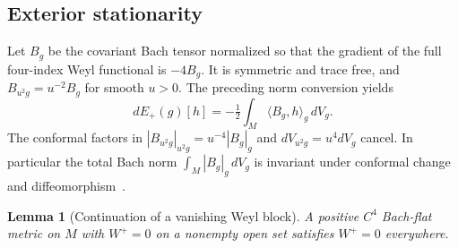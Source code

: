 \documentclass[11pt]{article}
\numberwithin{equation}{section}
\newtheorem{lemma}[theorem]{Lemma}
\theoremstyle{definition}
\theoremstyle{remark}
\begin{document}
\subsection{Exterior stationarity}

Let \(B_g\) be the covariant Bach tensor normalized so that the
gradient of the full four-index Weyl functional is \(-4B_g\).
It is symmetric and trace free, and
\(B_{u^2g}=u^{-2}B_g\) for smooth \(u>0\). The preceding norm
conversion yields
\begin{equation}\label{var:bach}
 dE_+(g)[h]=-\tfrac12\int_M\langle B_g,h\rangle_g\,dV_g .
\end{equation}
The conformal factors in \(|B_{u^2g}|_{u^2g}=u^{-4}|B_g|_g\)
and \(dV_{u^2g}=u^4dV_g\) cancel. In particular the total
Bach norm \(\int_M |B_g|_g\,dV_g\) is invariant under conformal
change and diffeomorphism~\cite[\S1 and (1.1)]{BahuaudGuentherIsenbergMazzeo2025Bach}.

\begin{lemma}[Continuation of a vanishing Weyl block]\label{var:continuation}
A positive \(C^4\) Bach-flat metric on \(M\) with \(W^+=0\) on a
nonempty open set satisfies \(W^+=0\) everywhere.
\end{lemma}
\end{document}
